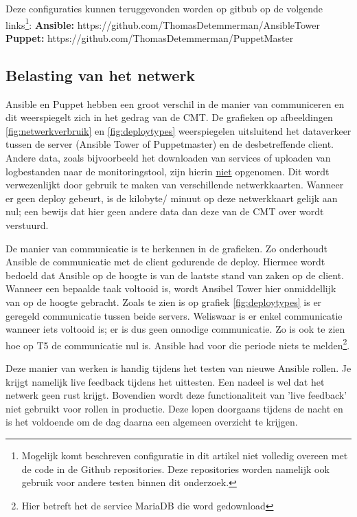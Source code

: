 Deze configuraties kunnen teruggevonden worden op gitbub op de volgende links\footnote{Mogelijk komt beschreven configuratie in dit artikel niet volledig overeen met de code in de Github repositories. Deze repositories worden namelijk ook gebruik voor andere testen  binnen dit onderzoek.}:\newline
\textbf{Ansible:} https://github.com/ThomasDetemmerman/AnsibleTower \newline
\textbf{Puppet:} https://github.com/ThomasDetemmerman/PuppetMaster

\subsection{Belasting van het netwerk}
Ansible en Puppet hebben een groot verschil in de manier van communiceren en dit weerspiegelt zich in het gedrag van de \gls{CMT}. De grafieken op afbeeldingen \ref{fig:netwerkverbruik} en \ref{fig:deploytypes} weerspiegelen uitsluitend het dataverkeer tussen de server (Ansible Tower of Puppetmaster) en de desbetreffende client. Andere data, zoals bijvoorbeeld het downloaden van services of uploaden van logbestanden naar de monitoringstool, zijn hierin \underline{niet} opgenomen. Dit wordt verwezenlijkt door gebruik te maken van verschillende netwerkkaarten. Wanneer er geen deploy gebeurt, is de kilobyte/ minuut op deze netwerkkaart gelijk aan nul; een bewijs dat hier geen andere data dan deze van de \gls{CMT} over wordt verstuurd.  
	
De manier van communicatie is te herkennen in de grafieken. Zo onderhoudt Ansible de communicatie met de client gedurende de deploy. Hiermee wordt bedoeld dat Ansible op de hoogte is van de laatste stand van zaken op de client. Wanneer een bepaalde taak voltooid is, wordt Ansibel Tower hier onmiddellijk van op de hoogte gebracht. Zoals te zien is op grafiek \ref{fig:deploytypes} is er geregeld communicatie tussen beide servers. Weliswaar is er enkel communicatie wanneer iets voltooid is; er is dus geen onnodige communicatie. Zo is ook te zien hoe op T5 de communicatie nul is. Ansible had voor die periode niets te melden\footnote{Hier betreft het de service MariaDB die word gedownload}. 

Deze manier van werken is handig tijdens het testen van nieuwe Ansible rollen. Je krijgt namelijk live feedback tijdens het uittesten. Een nadeel is wel dat het netwerk geen rust krijgt. Bovendien wordt deze functionaliteit van 'live feedback' niet gebruikt voor rollen in productie. Deze lopen doorgaans tijdens de nacht en is het voldoende om de dag daarna een algemeen overzicht te krijgen. 

